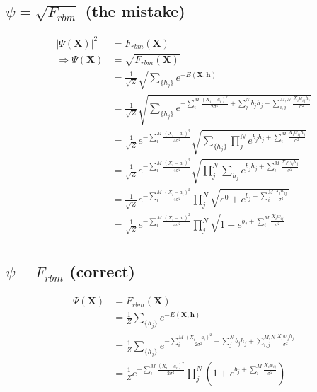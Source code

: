 \documentclass[norsk,a4paper,11pt]{article}
\begin{document}
\subsection{$\psi = \sqrt{F_{rbm}}$ (the mistake)}
\color{Black}
\begin{align}
	|\Psi (\mathbf{X})|^2 &= F_{rbm}(\mathbf{X}) \\
	\Rightarrow \Psi (\mathbf{X}) &= \sqrt{F_{rbm}(\mathbf{X})} \\
	&= \frac{1}{\sqrt{Z}}\sqrt{\sum_{\{h_j\}} e^{-E(\mathbf{X}, \mathbf{h})}} \\
	&= \frac{1}{\sqrt{Z}} \sqrt{\sum_{\{h_j\}} e^{-\sum_i^M \frac{(X_i - a_i)^2}{2\sigma^2} + \sum_j^N b_j h_j + \sum_{i,j}^{M,N} \frac{X_i w_{ij} h_j}{\sigma^2}} }\\
	&= \frac{1}{\sqrt{Z}} e^{-\sum_i^M \frac{(X_i - a_i)^2}{4\sigma^2}} \sqrt{\sum_{\{h_j\}} \prod_j^N e^{b_j h_j + \sum_i^M \frac{X_i w_{ij} h_j}{\sigma^2}}} \\
	&= \frac{1}{\sqrt{Z}} e^{-\sum_i^M \frac{(X_i - a_i)^2}{4\sigma^2}} \sqrt{\prod_j^N \sum_{h_j}  e^{b_j h_j + \sum_i^M \frac{X_i w_{ij} h_j}{\sigma^2}}} \\
	&= \frac{1}{\sqrt{Z}} e^{-\sum_i^M \frac{(X_i - a_i)^2}{4\sigma^2}} \prod_j^N \sqrt{e^0 + e^{b_j + \sum_i^M \frac{X_i w_{ij}}{\sigma^2}}} \\
	&= \frac{1}{\sqrt{Z}} e^{-\sum_i^M \frac{(X_i - a_i)^2}{4\sigma^2}} \prod_j^N \sqrt{1 + e^{b_j + \sum_i^M \frac{X_i w_{ij}}{\sigma^2}}} \\
\end{align}

\color{Blue}
\subsection{$\psi = F_{rbm}$ (correct)}
\color{Black}

\begin{align}
\Psi (\mathbf{X}) &= F_{rbm}(\mathbf{X}) \\
&= \frac{1}{Z}\sum_{\{h_j\}} e^{-E(\mathbf{X}, \mathbf{h})} \\
&= \frac{1}{Z} \sum_{\{h_j\}} e^{-\sum_i^M \frac{(X_i - a_i)^2}{2\sigma^2} + \sum_j^N b_j h_j + \sum_{i,j}^{M,N} \frac{X_i w_{ij} h_j}{\sigma^2}} \\
&= \frac{1}{Z} e^{-\sum_i^M \frac{(X_i - a_i)^2}{2\sigma^2}} \prod_j^N (1 + e^{b_j + \sum_i^M \frac{X_i w_{ij}}{\sigma^2}}) \\
\end{align}
\end{document}
